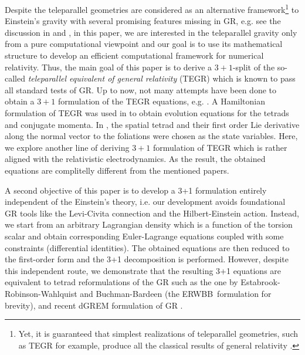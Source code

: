 \documentclass[
10pt, %
a4paper, %
oneside, %
twocolumn,
headinclude,footinclude, %
BCOR5mm, %
]{scrartcl}
\newcommand{\ERWBB}{{ERWBB}}
\begin{document}
	Despite the teleparallel geometries are considered as an alternative
	framework\footnote{Yet, it is guaranteed that simplest realizations of teleparallel geometries, such as TEGR for example, produce all the
	classical results of general relativity
	\cite{AldrovandiPereiraBook,Bahamonde2021a}.} to Einstein's gravity with
	several promising features missing in GR, e.g. see the discussion in
	\cite[Sec.18]{AldrovandiPereiraBook} and \cite{Cai2016}, in this paper, we
	are interested in the teleparallel gravity only from a pure computational
	viewpoint and our goal is to use its mathematical structure to develop an
	efficient computational framework for numerical relativity. Thus, the main
	goal of this paper is to derive a $ 3+1 $-split of the so-called
	\emph{teleparallel equivalent of general relativity} (TEGR)
	\cite{AldrovandiPereiraBook,Krssak2019} which is known to pass all standard
	tests of GR. Up to now, not many attempts have been done to obtain a $ 3+1
	$ formulation of the TEGR equations, e.g. \cite{Capozziello2021,Pati2022}. A
	Hamiltonian formulation of TEGR was used in \cite{Pati2022} to obtain
	evolution equations for the tetrads and conjugate momenta. In
	\cite{Capozziello2021}, the spatial tetrad and their first order Lie
	derivative along the normal vector to the foliations were chosen as the
	state variables. Here, we explore another line of deriving $ 3+1 $
	formulation of TEGR which is rather aligned with the relativistic
	electrodynamics. As the result, the obtained equations are complitelly
	different from the mentioned papers.

	A second objective of this paper is to develop a 3+1 formulation entirely
	independent of the Einstein's theory, i.e. our development avoids
	foundational GR tools like the Levi-Civita connection and the
	Hilbert-Einstein action. Instead, we start from an arbitrary Lagrangian
	density which is a function of the torsion scalar and obtain corresponding
	Euler-Lagrange equations coupled with some constraints (differential
	identities). The obtained equations are then reduced to the first-order form
	and the 3+1 decomposition is performed. However, despite this independent
	route, we demonstrate that the resulting 3+1 equations are equivalent to
	tetrad reformulations of the GR such as the one by
	Estabrook-Robinson-Wahlquist \cite{Estabrook1997} and Buchman-Bardeen
	\cite{Buchman2003} (the \ERWBB\ formulation for brevity), and recent dGREM formulation of GR \cite{Olivares2022}. 
	
\end{document}
